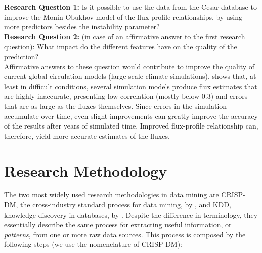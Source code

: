 \documentclass[12pt]{book}
\begin{document}
\textbf{Research Question 1:} Is it possible to use the data from the Cesar database to improve the Monin-Obukhov model of the flux-profile relationships, by using more predictors besides the instability parameter? \\

\textbf{Research Question 2:} (in case of an affirmative answer to the first research question): What impact do the different features have on the quality of the prediction? \\

Affirmative answers to these question would contribute to improve the quality of current global circulation models (large scale climate simulations). \cite{sheba} shows that, at least in difficult conditions, several simulation models produce flux estimates that are highly inaccurate, presenting low correlation (mostly below 0.3) and errors that are as large as the fluxes themselves. Since errors in the simulation accumulate over time, even slight improvements can greatly improve the accuracy of the results after years of simulated time. Improved flux-profile relationship can, therefore, yield more accurate estimates of the fluxes.

\section{Research Methodology}
\label{sec:research_methodology}
The two most widely used research methodologies in data mining are CRISP-DM, the cross-industry standard process for data mining, by \cite{crispdm}, and KDD, knowledge discovery in databases, by \cite{kdd}. Despite the difference in terminology, they essentially describe the same process for extracting useful information, or \emph{patterns}, from one or more raw data sources. This process is composed by the following steps (we use the nomenclature of CRISP-DM):
\end{document}
